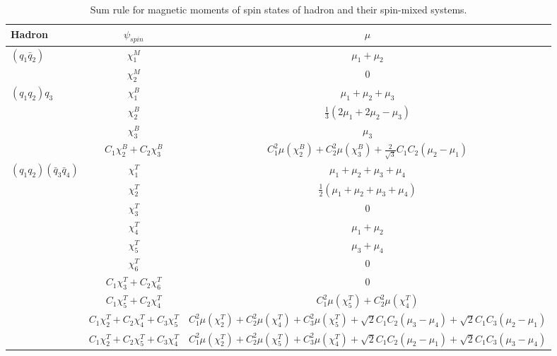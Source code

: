 \documentclass[12pt,onecolumn,floatfix,nofootinbib]{revtex4}
\begin{document}
\begin{table}[!htb]
\caption{Sum rule for magnetic moments of spin states of hadron and their
spin-mixed systems.}
\label{tab:musum}%
\begin{tabular}{lcc}
\hline\hline
\textrm{Hadron} & $\psi_{spin}$ & $\mu$ \\ \hline
$\left(q_{1}{\bar{q}}_{2}\right)$ & $\chi_{1}^{M}$ & $\mu_{1}+\mu_{2}$ \\
& $\chi_{2}^{M}$ & 0 \\
$\left(q_{1}q_{2}\right)q_{3}$ & $\chi_{1}^{B}$ & $\mu_{1}+\mu_{2}+\mu_{3}$
\\
& $\chi_{2}^{B}$ & $\frac{1}{3}\left(2\mu_{1}+2\mu_{2}-\mu_{3}\right)$ \\
& $\chi_{3}^{B}$ & $\mu_{3}$ \\
& $C_{1}\chi_{2}^{B}+C_{2}\chi_{3}^{B}$ & $C_{1}^{2}\mu\left(\chi_{2}^{B}%
\right) + C_{2}^{2}\mu\left(\chi_{3}^{B}\right) + \frac{2}{\sqrt{3}}%
C_{1}C_{2}\left(\mu_{2}-\mu_{1}\right)$ \\
$\left(q_{1}q_{2}\right)\left({\bar{q}}_{3}{\bar{q}}_{4}\right)$ & $%
\chi_{1}^{T}$ & $\mu_{1}+\mu_{2}+\mu_{3}+\mu_{4}$ \\
& $\chi_{2}^{T}$ & $\frac{1}{2}\left(\mu_{1}+\mu_{2}+\mu_{3}+\mu_{4}\right)$
\\
& $\chi_{3}^{T}$ & 0 \\
& $\chi_{4}^{T}$ & $\mu_{1}+\mu_{2}$ \\
& $\chi_{5}^{T}$ & $\mu_{3}+\mu_{4}$ \\
& $\chi_{6}^{T}$ & 0 \\
& $C_{1}\chi_{3}^{T}+C_{2}\chi_{6}^{T}$ & 0 \\
& $C_{1}\chi_{5}^{T}+C_{2}\chi_{4}^{T}$ & $C_{1}^{2}\mu\left(\chi_{5}^{T}%
\right) + C_{2}^{2}\mu\left(\chi_{4}^{T}\right)$ \\
& $C_{1}\chi_{2}^{T}+C_{2}\chi_{4}^{T}+C_{3}\chi_{5}^{T}$ & $%
C_{1}^{2}\mu\left(\chi_{2}^{T}\right) +
C_{2}^{2}\mu\left(\chi_{4}^{T}\right) +
C_{3}^{2}\mu\left(\chi_{5}^{T}\right) + \sqrt{2}C_{1}C_{2}\left(\mu_{3}-%
\mu_{4}\right) + \sqrt{2}C_{1}C_{3}\left(\mu_{2}-\mu_{1}\right)$ \\
& $C_{1}\chi_{2}^{T}+C_{2}\chi_{5}^{T}+C_{3}\chi_{4}^{T}$ & $%
C_{1}^{2}\mu\left(\chi_{2}^{T}\right) +
C_{2}^{2}\mu\left(\chi_{5}^{T}\right) +
C_{3}^{2}\mu\left(\chi_{4}^{T}\right) + \sqrt{2}C_{1}C_{2}\left(\mu_{2}-%
\mu_{1}\right) + \sqrt{2}C_{1}C_{3}\left(\mu_{3}-\mu_{4}\right)$ \\
\hline\hline
\end{tabular}%
\end{table}
\end{document}
